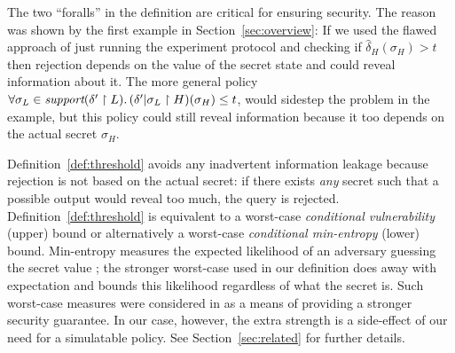 The two ``foralls'' in the definition are critical for ensuring
security.  The reason was shown by the first example in
Section~\ref{sec:overview}: If we used the flawed approach of just
running the experiment protocol and checking if
$\hat{\delta}_H(\sigma_H) > t$ then rejection depends on the value of
the secret state and could reveal information about it.  The more
general policy $\forall \sigma_L \in \textit{support}(\delta' \upharpoonright L).\,
(\delta' | \sigma_L \upharpoonright H)(\sigma_H) \leq t $, would
sidestep the problem in the example, but this policy could still
reveal information because it too depends on the actual secret
$\sigma_H$.

Definition~\ref{def:threshold} avoids any inadvertent information
leakage because rejection is not based on the actual secret: if there
exists \emph{any} secret such that a possible output would reveal too
much, the query is rejected. Definition~\ref{def:threshold} is
equivalent to a worst-case \emph{conditional vulnerability} (upper)
bound or alternatively a worst-case \emph{conditional min-entropy}
(lower) bound. Min-entropy measures the expected likelihood of an
adversary guessing the secret value \cite{smith09foundations}; the
stronger worst-case used in our definition does away with expectation
and bounds this likelihood regardless of what the secret is. Such
worst-case measures were considered in \cite{koepfbasin07} as a means
of providing a stronger security guarantee. In our case, however, the
extra strength is a side-effect of our need for a simulatable
policy. See Section~\ref{sec:related} for further details.


